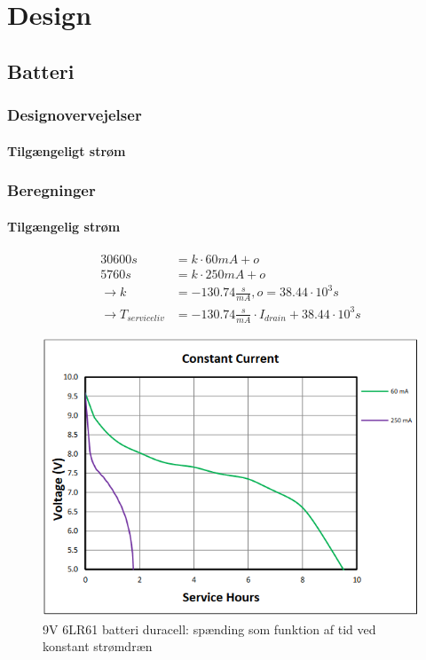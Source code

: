\documentclass[../main.tex]{subfiles}
\begin{document}
\chapter{Design} \label{Chap:Design}

\section{Batteri}

\subsection{Designovervejelser}


\subsubsection{Tilgængeligt strøm}




\subsection{Beregninger}
\subsubsection{Tilgængelig strøm}


\begin{align*}
    30600s &= k \cdot 60mA + o \\
    5760s &= k \cdot 250mA + o \\
    \rightarrow k &= -130.74 \frac{s}{mA}, o = 38.44\cdot 10^3s\\
    \rightarrow T_{serviceliv} &= -130.74\frac{s}{mA} \cdot I_{drain} + 38.44\cdot 10^3s
\end{align*}


 \begin{figure}[H]
    \centering
    \includegraphics[scale=0.8]{Overleaf/Pictures/Grafer/Stroemogspaendingskurve.png}
    \captionsetup{format=hang}
    \caption{9V 6LR61 batteri duracell: spænding som funktion af tid ved konstant strømdræn}
    \label{fig: batstrømkurve}
\end{figure}
\end{document}
